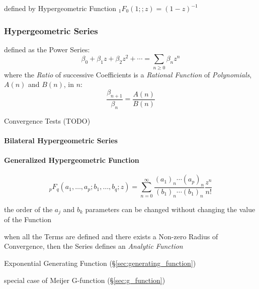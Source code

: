 defined by Hypergeometric Function $_1F_0(1;; z) = (1 - z)^{-1}$



\subsubsection{Hypergeometric Series}\label{sec:hypergeometric_series}

defined as the Power Series:
\[
  \beta_0 + \beta_1 z + \beta_2 z^2 + \cdots = \sum_{n\geq{0}} \beta_n z^n
\]
where the \emph{Ratio} of successive Coefficients is a \emph{Rational Function}
of \emph{Polynomials}, $A(n)$ and $B(n)$, in $n$:
\[
  \frac{\beta_{n+1}}{\beta_n} = \frac{A(n)}{B(n)}
\]

Convergence Tests (TODO)



\paragraph{Bilateral Hypergeometric Series}\label{sec:bilateral_hypergeometric}

\paragraph{Generalized Hypergeometric Function}
\label{sec:generalized_hypergeometric_function}\hfill

\[
  _pF_q(a_1, \ldots, a_p; b_1, \ldots, b_q; z) =
    \sum_{n=0}^\infty
      \frac{(a_1)_n \cdots (a_p)_n}{(b_1)_n \cdots (b_1)_n}
      \frac{z^n}{n!}
\]

the order of the $a_j$ and $b_k$ parameters can be changed without changing the
value of the Function

when all the Terms are defined and there exists a Non-zero Radius of
Convergence, then the Series defines an \emph{Analytic Function}

\fist Exponential Generating Function (\S\ref{sec:generating_function})

\fist special case of Meijer G-function (\S\ref{sec:g_function})

